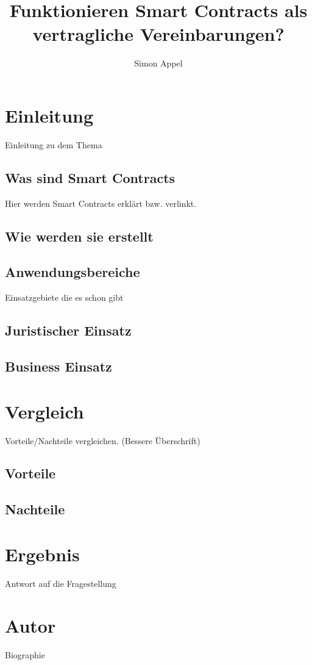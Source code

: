 \documentclass[]{protocol}
\title{Funktionieren Smart Contracts als vertragliche Vereinbarungen?}
\author{Simon Appel}
\begin{document}
\newpage

\section{Einleitung}
Einleitung zu dem Thema
\subsection{Was sind Smart Contracts}
Hier werden Smart Contracts erklärt bzw. verlinkt. 
\subsection{Wie werden sie erstellt}

\subsection{Anwendungsbereiche}
Einsatzgebiete die es schon gibt
\subsection{Juristischer Einsatz}
\subsection{Business Einsatz}
\section{Vergleich}
Vorteile/Nachteile vergleichen. (Bessere Überschrift)
\subsection{Vorteile}
\subsection{Nachteile}
\section{Ergebnis}
Antwort auf die Fragestellung
\section{Autor}
Biographie
\newpage
\end{document}
